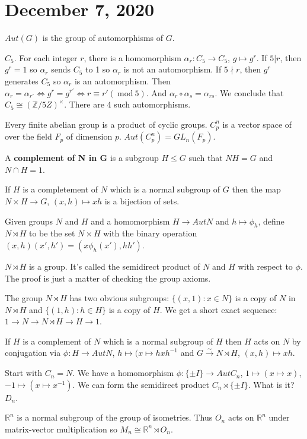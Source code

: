 \documentclass{article}
\newcommand{\vocab}[1]{\textbf{\color{blue!90}\boldmath #1}}
\newcommand{\R}{\mathbb{R}}
\newcommand{\Z}{\mathbb{Z}}
\newcommand{\notdiv}{\nmid}
\renewcommand{\mod}[1]{\ \text{mod}\ #1}
\newcommand{\ra}[1][]{\xrightarrow{#1}}
\begin{document}
\section{December 7, 2020}
\begin{definition}
$Aut(G)$ is the group of automorphisms of $G$.
\end{definition}
\begin{example}
$C_5$. For each integer $r$, there is a homomorphism $\alpha_r:C_5\ra C_5$, $g\mapsto g^r$. If $5|r$, then $g^r=1$ so $\alpha_r$ sends $C_5$ to 1 so $\alpha_r$ is not an automorphism. If $5\notdiv r$, then $g^r$ generates $C_5$ so $\alpha_r$ is an automorphism. Then $\alpha_r=\alpha_{r'}\iff g^r=g^{r'}\iff r\equiv r'(\mod{5})$. And $\alpha_r\circ \alpha_s=\alpha_{rs}$. We conclude that $C_5\cong (\Z/5Z)^\times$. There are 4 such automorphisms.
\end{example}
\begin{example}
Every finite abelian group is a product of cyclic groups. $C_p^n$ is a vector space of over the field $F_p$ of dimension $p$. $Aut(C_p^n)=GL_n(F_p)$.
\end{example}
\begin{definition}
A \vocab{complement of N in G} is a subgroup $H\leq G$ such that $NH=G$ and $N\cap H=1$. 
\end{definition}
\begin{proposition}
If $H$ is a completement of $N$ which is a normal subgroup of $G$ then the map $N\times H\ra G$, $(x,h)\mapsto xh$ is a bijection of sets.
\end{proposition}
\begin{definition}
Given groups $N$ and $H$ and a homomorphism $H\ra Aut N$ and $h\mapsto \phi_h$, define $N\rtimes H$ to be the set $N\times H$ with the binary operation $(x,h)(x',h')=(x\phi_h(x'),hh')$.
\end{definition}
\begin{proposition}
$N\rtimes H$ is a group. It's called the semidirect product of $N$ and $H$ with respect to $\phi$. The proof is just a matter of checking the group axioms.
\end{proposition}
The group $N\rtimes H$ has two obvious subgroups: $\{(x,1):x\in N\}$ is a copy of $N$ in $N\rtimes H$ and $\{(1,h):h\in H\}$ is a copy of $H$. We get a short exact sequence: $1\ra N\ra N\rtimes H\ra H\ra 1$. 
\begin{proposition}
If $H$ is a complement of $N$ which is a normal subgroup of $H$ then $H$ acts on $N$ by conjugation via $\phi:H\ra Aut N$, $h\mapsto (x\mapsto hxh^{-1}$ and $G\ra[\sim]N\rtimes H$, $(x,h)\mapsto xh$.
\end{proposition}
\begin{example}
Start with $C_n=N$. We have a homomorphism $\phi:\{\pm I\}\ra Aut C_n$, $1\mapsto (x\mapsto x)$, $-1\mapsto (x\mapsto x^{-1})$. We can form the semidirect product $C_n\rtimes \{\pm I\}$. What is it? $D_n$. 
\end{example}
\begin{example}
$\R^n$ is a normal subgroup of the group of isometries. Thus $O_n$ acts on $\R^n$ under matrix-vector multiplication so $M_n\cong \R^n\rtimes O_n$. 
\end{example}
\end{document}
